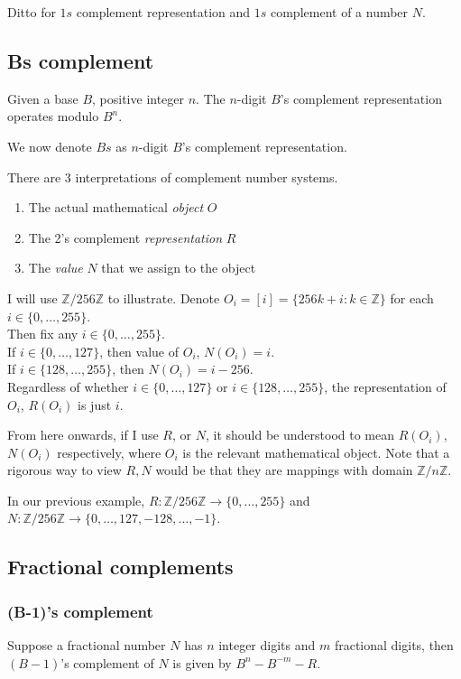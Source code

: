 \documentclass{article}
\begin{document}
Ditto for $1s$ complement representation and $1s$ complement of a number $N$.

\subsection{Bs complement}
Given a base $B$, positive integer $n$. The $n$-digit $B$'s complement representation operates modulo $B^n$.

We now denote $Bs$ as $n$-digit $B$'s complement representation.

There are 3 interpretations of complement number systems.
\begin{enumerate}
	\item The actual mathematical \textit{object} $O$
	\item The 2's complement \textit{representation} $R$
	\item The \textit{value} $N$ that we assign to the object 
\end{enumerate}
I will use $\mathbb{Z}/256\mathbb{Z}$ to illustrate.
Denote $O_i=[i]=\{256k + i: k\in \mathbb{Z}\}$ for each $i\in \{0,\dots, 255\}$.\\
Then fix any $i\in \{0,\dots, 255\}$.\\
If $i\in \{0,\dots, 127\}$, then value of $O_i$, $N(O_i)=i$.\\
If $i\in \{128,\dots, 255\}$, then $N(O_i)=i-256$.\\
Regardless of whether $i\in \{0,\dots, 127\}$ or $i\in \{128,\dots, 255\}$, the representation of $O_i$, $R(O_i)$ is just $i$.

From here onwards, if I use $R$, or $N$, it should be understood to mean $R(O_i)$, $N(O_i)$ respectively, where $O_i$ is the relevant mathematical object. Note that a rigorous way to view $R,N$ would be that they are mappings with domain $\mathbb{Z}/n\mathbb{Z}$.

In our previous example, $R: \mathbb{Z}/256\mathbb{Z}\rightarrow \{0,\dots, 255\}$ and $N: \mathbb{Z}/256\mathbb{Z}\rightarrow \{0,\dots, 127,-128,\dots, -1\}$.

\subsection{Fractional complements}
\subsubsection{(B-1)'s complement}
Suppose a fractional number $N$ has $n$ integer digits and $m$ fractional digits, then $(B-1)$'s complement of $N$ is given by $B^n-B^{-m}-R$.
\end{document}
